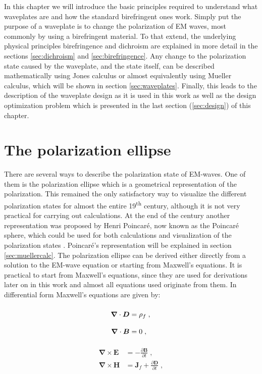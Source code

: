 In this chapter we will introduce the basic principles required to understand what waveplates are and how the standard birefringent ones work. Simply put the purpose of a waveplate is to change the polarization of EM waves, most commonly by using a birefringent material. To that extend, the underlying physical principles birefringence and dichroism are explained in more detail in the sections \ref{sec:dichroism} and \ref{sec:birefringence}. Any change to the polarization state caused by the waveplate, and the state itself, can be described mathematically using Jones calculus or almost equivalently using Mueller calculus, which will be shown in section \ref{sec:waveplates}. Finally, this leads to the description of the waveplate design as it is used in this work as well as the design optimization problem which is presented in the last section (\ref{sec:design}) of this chapter.

\section{The polarization ellipse}
\label{sec:polellipse}
There are several ways to describe the polarization state of EM-waves. One of them is the polarization ellipse which is a geometrical representation of the polarization. This remained the only satisfactory way to visualize the different polarization states for almost the entire 19\textsuperscript{th} century, although it is not very practical for carrying out calculations. At the end of the century another representation was proposed by Henri Poincaré, now known as the Poincaré sphere, which could be used for both calculations and visualization of the polarization states \cite{Collett2008VisualizationSphere}. Poincaré's representation will be explained in section \ref{sec:muellercalc}. The polarization ellipse can be derived either directly from a solution to the EM-wave equation or starting from Maxwell's equations.  It is practical to start from Maxwell's equations, since they are used for derivations later on in this work and almost all equations used originate from them. In differential form Maxwell's equations are given by: 
\par
\noindent\begin{minipage}{.5\linewidth}
\begin{align}
    \bm{\nabla}\cdot\bm{D} &=\rho_{f}\;,\label{eq:maxwell1}
    \vphantom{\frac{\partial\bm{B}}{\partial t}}\\
    \bm{\nabla}\cdot\bm{B} &=0\;,\vphantom{\frac{\partial\bm{B}}{\partial t}}\label{eq:maxwell2}
\end{align}
\end{minipage}%
\begin{minipage}{.5\linewidth}
\begin{align}
    \bm{\nabla}\times\bm{E} &=-\frac{\partial\bm{B}}{\partial t}\;,\label{eq:maxwell3}
    \\
    \bm{\nabla}\times\bm{H} &=\bm{J}_f
    +\frac{\partial\bm{D}}{\partial t}\;,\label{eq:maxwell4}
\end{align}
\end{minipage}
\newline

